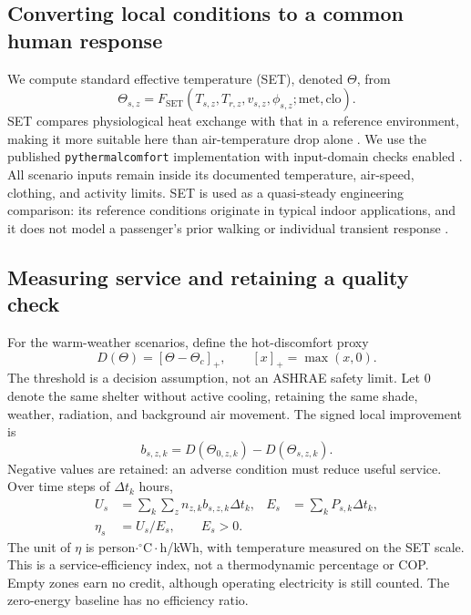 \documentclass[12pt]{article}
\begin{document}
\subsection{Converting local conditions to a common human response}

We compute standard effective temperature (SET), denoted $\Theta$, from
\begin{equation}
 \Theta_{s,z}=F_{\mathrm{SET}}(T_{s,z},T_{r,z},v_{s,z},\phi_{s,z};\mathrm{met},\mathrm{clo}).
\label{eq:set}
\end{equation}
SET compares physiological heat exchange with that in a reference environment, making it more suitable here than air-temperature drop alone \cite{thermalcomfort,fanguide}. We use the published \texttt{pythermalcomfort} implementation with input-domain checks enabled \cite{pythermal}. All scenario inputs remain inside its documented temperature, air-speed, clothing, and activity limits. SET is used as a quasi-steady engineering comparison: its reference conditions originate in typical indoor applications, and it does not model a passenger's prior walking or individual transient response \cite{thermalcomfort}.

\subsection{Measuring service and retaining a quality check}

For the warm-weather scenarios, define the hot-discomfort proxy
\begin{equation}
 D(\Theta)=[\Theta-\Theta_c]_+,\qquad [x]_+=\max(x,0).
\end{equation}
The threshold is a decision assumption, not an ASHRAE safety limit. Let $0$ denote the same shelter without active cooling, retaining the same shade, weather, radiation, and background air movement. The signed local improvement is
\begin{equation}
 b_{s,z,k}=D(\Theta_{0,z,k})-D(\Theta_{s,z,k}).
\end{equation}
Negative values are retained: an adverse condition must reduce useful service. Over time steps of $\Delta t_k$ hours,
\begin{align}
 U_s&=\sum_k\sum_z n_{z,k}b_{s,z,k}\Delta t_k, &
 E_s&=\sum_k P_{s,k}\Delta t_k,\\
 \eta_s&=U_s/E_s,\qquad E_s>0.
\label{eq:bus-efficiency}
\end{align}
The unit of $\eta$ is person$\cdot{}^{\circ}\mathrm C\cdot$h/kWh, with temperature measured on the SET scale. This is a service-efficiency index, not a thermodynamic percentage or COP. Empty zones earn no credit, although operating electricity is still counted. The zero-energy baseline has no efficiency ratio.
\end{document}
